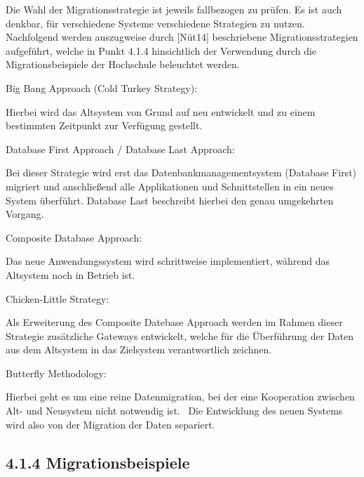 \documentclass[a4paper]{article}
\begin{document}
\bigskip

{\sffamily
Die Wahl der Migrationsstrategie ist jeweils fallbezogen zu prüfen. Es ist auch denkbar, für verschiedene Systeme
verschiedene Strategien zu nutzen. Nachfolgend werden auszugweise durch [Nüt14] beschriebene Migrationsstrategien
aufgeführt, welche in Punkt 4.1.4 hinsichtlich der Verwendung durch die Migrationsbeispiele der Hochschule beleuchtet
werden.}


\bigskip

{\sffamily
Big Bang Approach (Cold Turkey Strategy):}


\bigskip

{\sffamily
Hierbei wird das Altsystem von Grund auf neu entwickelt und zu einem bestimmten Zeitpunkt zur Verfügung gestellt.}


\bigskip

{\sffamily
Database First Approach / Database Last Approach:}


\bigskip

{\sffamily
Bei dieser Strategie wird erst das Datenbankmanagementsystem (Database First) migriert und anschließend alle
Applikationen und Schnittstellen in ein neues System überführt. Database Last beschreibt hierbei den genau umgekehrten
Vorgang.}


\bigskip

{\sffamily
Composite Database Approach:}


\bigskip

{\sffamily
Das neue Anwendungssystem wird schrittweise implementiert, während das Altsystem noch in Betrieb ist.}


\bigskip

{\sffamily
Chicken-Little Strategy:}


\bigskip

{\sffamily
Als Erweiterung des Composite Datebase Approach werden im Rahmen dieser Strategie zusätzliche Gateways entwickelt,
welche für die Überführung der Daten aus dem Altsystem in das Zielsystem verantwortlich zeichnen.}


\bigskip

{\sffamily
Butterfly Methodology:}


\bigskip

{\sffamily
Hierbei geht es um eine reine Datenmigration, bei der eine Kooperation zwischen Alt- und Neusystem nicht notwendig ist.
\ Die Entwicklung des neuen Systems wird also von der Migration der Daten separiert.}

\subsection{4.1.4 Migrationsbeispiele}
\end{document}
